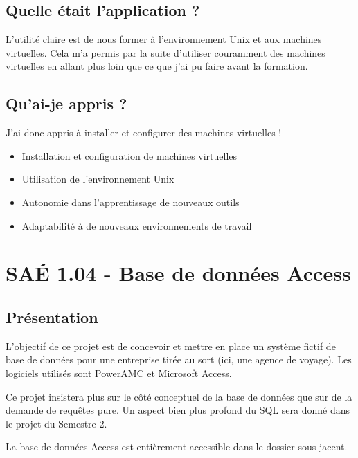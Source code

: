 \documentclass{mytex}
\begin{document}
\subsection{Quelle était l'application ?}

L'utilité claire est de nous former à l'environnement Unix et aux machines virtuelles. Cela m'a permis par la suite d'utiliser couramment des machines virtuelles en allant plus loin que ce que j'ai pu faire avant la formation.

\subsection{Qu'ai-je appris ?}

J'ai donc appris à installer et configurer des machines virtuelles !

\begin{itemize}
	\item Installation et configuration de machines virtuelles
	\item Utilisation de l'environnement Unix
\end{itemize}

\begin{itemize}
	\item Autonomie dans l'apprentissage de nouveaux outils
	\item Adaptabilité à de nouveaux environnements de travail
\end{itemize}

\section{SAÉ 1.04 - Base de données Access}

\subsection{Présentation}

L’objectif de ce projet est de concevoir et mettre en place un système fictif de base de données pour une entreprise tirée au sort (ici, une agence de voyage). Les logiciels utilisés sont PowerAMC et Microsoft Access.

Ce projet insistera plus sur le côté conceptuel de la base de données que sur de la demande de requêtes pure. Un aspect bien plus profond du SQL sera donné dans le projet du Semestre 2.

La base de données Access est entièrement accessible dans le dossier sous-jacent.
\end{document}
